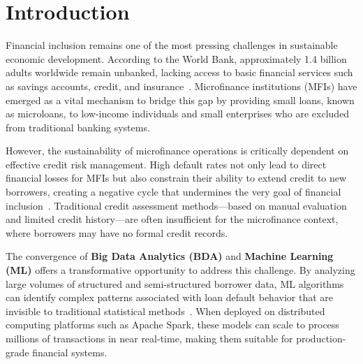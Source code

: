 \documentclass[runningheads]{llncs}
\begin{document}

\section{Introduction}
\label{sec:introduction}

Financial inclusion remains one of the most pressing challenges in sustainable economic development. According to the World Bank, approximately 1.4 billion adults worldwide remain unbanked, lacking access to basic financial services such as savings accounts, credit, and insurance~\cite{chen2014bigdata}. Microfinance institutions (MFIs) have emerged as a vital mechanism to bridge this gap by providing small loans, known as microloans, to low-income individuals and small enterprises who are excluded from traditional banking systems.

However, the sustainability of microfinance operations is critically dependent on effective credit risk management. High default rates not only lead to direct financial losses for MFIs but also constrain their ability to extend credit to new borrowers, creating a negative cycle that undermines the very goal of financial inclusion~\cite{bazarbash2019financial}. Traditional credit assessment methods---based on manual evaluation and limited credit history---are often insufficient for the microfinance context, where borrowers may have no formal credit records.

The convergence of \textbf{Big Data Analytics (BDA)} and \textbf{Machine Learning (ML)} offers a transformative opportunity to address this challenge. By analyzing large volumes of structured and semi-structured borrower data, ML algorithms can identify complex patterns associated with loan default behavior that are invisible to traditional statistical methods~\cite{khandani2010ml}. When deployed on distributed computing platforms such as Apache Spark, these models can scale to process millions of transactions in near real-time, making them suitable for production-grade financial systems.
\end{document}
